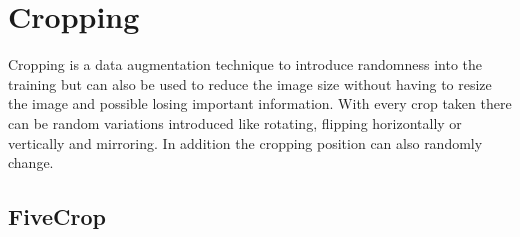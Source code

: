 \begin{table}[h]
    \caption{Accuracy (\%) for several learning rates and lr-decays for CNN\_Basic as a baseline.}
    \centering
    \begin{small}
    \textsc{
    }
    \end{small}
    \vspace{-3.9mm}
    \label{tbl:cnn-basic-baseline}
\end{table}

\section{Cropping}

Cropping is a data augmentation technique to introduce randomness into the training but can also be used to reduce the image size without having to resize the image and possible losing important information. With every crop taken there can be random variations introduced like rotating, flipping horizontally or vertically and mirroring. In addition the cropping position can also randomly change.

\subsection{FiveCrop}


